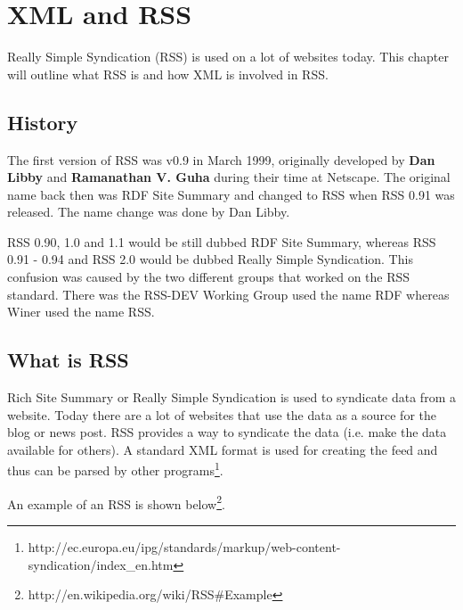\chapter{XML and RSS}
\label{chap:XML and RSS}
Really Simple Syndication (RSS) is used on a lot of websites today. This chapter will outline what RSS is and how XML is involved in RSS.

\section{History}
The first version of RSS was v0.9 in March 1999, originally developed by \textbf{Dan Libby} and \textbf{Ramanathan V. Guha} during their time at Netscape. The original name back then was RDF Site Summary and changed to RSS when RSS 0.91 was released. The name change was done by Dan Libby.

RSS 0.90, 1.0 and 1.1 would be still dubbed RDF Site Summary, whereas RSS 0.91 - 0.94 and RSS 2.0 would be dubbed Really Simple Syndication. This confusion was caused by the two different groups that worked on the RSS standard. There was the RSS-DEV Working Group used the name RDF whereas Winer used the name RSS.

\section{What is RSS}
\label{sec:what-is-rss}
Rich Site Summary or Really Simple Syndication is used to syndicate data from a website. Today there are a lot of websites that use the data as a source for the blog or news post. RSS provides a way to syndicate the data (i.e. make the data available for others). A standard XML format is used for creating the feed and thus can be parsed by other programs\footnote{http://ec.europa.eu/ipg/standards/markup/web-content-syndication/index\_en.htm}.

\break
An example of an RSS is shown below\footnote{http://en.wikipedia.org/wiki/RSS\#Example}.



